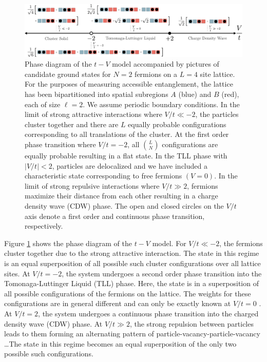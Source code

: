 \begin{figure}[h]
\begin{center}
\includegraphics[width=1.0\textwidth]{phaseDiagramtV.pdf}
\end{center}
\caption{Phase diagram of the $t-V$ model accompanied by pictures of candidate ground states for $N=2$ fermions on a $L=4$ site lattice. For the purposes of measuring accessible entanglement, the lattice has been bipartitioned into spatial subregions $A$ (blue) and $B$ (red), each of size $\ell = 2$. We assume periodic boundary conditions. In the limit of strong attractive interactions where $V/t \ll -2$, the particles cluster together and there are $L$ equally probable configurations corresponding to all translations of the cluster.  At the first order phase transition where $V/t = -2$, all ${L}\choose{N}$ configurations are equally probable resulting in a flat state. In the TLL phase with $|V/t| < 2$,  particles are delocalized and we have included a characteristic state corresponding to free fermions $(V=0)$. In the limit of strong repulsive interactions where $V/t \gg 2$, fermions maximize their distance from each other resulting in a charge density wave (CDW) phase. The open and closed circles on the $V/t$ axis denote a first order and continuous phase transition, respectively.}
\label{fig:phaseDiagram}
\end{figure}

Figure \ref{fig:phaseDiagram} shows the phase diagram of the $t-V$ model. For $V/t \ll -2$, the fermions cluster together due to the strong attractive interaction. The state in this regime is an equal superposition of all possible such cluster configurations over all lattice sites. At $V/t = -2$, the system undergoes a second order phase transition into the Tomonaga-Luttinger Liquid (TLL) phase. Here, the state is in a superposition of all possible configurations of the fermions on the lattice. The weights for these configurations are in general different and can only be exactly known at $V/t = 0$ \cite{PhysRevLett.121.150501}. At $V/t = 2$, the system undergoes a continuous phase transition into the charged density wave (CDW) phase. At $V/t \gg 2$, the strong repulsion between particles leads to them forming an alternating pattern of particle-vacancy-particle-vacancy \dots The state in this regime becomes an equal superposition of the only two possible such configurations.

